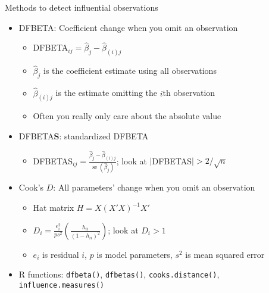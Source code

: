\documentclass[
  ignorenonframetext,
]{beamer}
\providecommand{\tightlist}{%
  \setlength{\itemsep}{0pt}\setlength{\parskip}{0pt}}
\newcommand{\setsep}{\setlength{\itemsep}{3pt}}
\newcommand{\setskip}{\setlength{\parskip}{3pt}}
\renewcommand{\tightlist}{\setsep\setskip}
\begin{document}
\begin{frame}[fragile]{Methods to detect influential observations}
\label{methods-to-detect-influential-observations}
\begin{itemize}[<+->]
\tightlist
\item
  DFBETA: Coefficient change when you omit an observation

  \begin{itemize}[<+->]
  \tightlist
  \item
    DFBETA\(_{ij} = \hat{\beta}_j - \hat{\beta}_{(i)j}\)
  \item
    \(\hat{\beta}_j\) is the coefficient estimate using all observations
  \item
    \(\hat{\beta}_{(i)j}\) is the estimate omitting the \(i\)th observation
  \item
    Often you really only care about the absolute value
  \end{itemize}
\item
  DFBETA\textbf{S}: standardized DFBETA

  \begin{itemize}[<+->]
  \tightlist
  \item
    DFBETAS\(_{ij} = \frac{\hat{\beta}_j - \hat{\beta}_{(i)j}}{\mathop{\mathrm{se}}\left(\hat{\beta}_j\right)}\); look at \(|\)DFBETAS\(| > 2/\sqrt{n}\)
  \end{itemize}
\item
  Cook's \(D\): All parameters' change when you omit an observation

  \begin{itemize}[<+->]
  \tightlist
  \item
    Hat matrix \(H = X (X'X)^{-1} X'\)
  \item
    \(D_i = \frac{e_i^2}{ps^2} \left(\frac{h_{ii}}{(1 - h_{ii})^2}\right)\); look at \(D_i > 1\)
  \item
    \(e_i\) is residual \(i\), \(p\) is model parameters, \(s^2\) is mean squared error
  \end{itemize}
\item
  R functions: \texttt{dfbeta()}, \texttt{dfbetas()}, \texttt{cooks.distance()}, \texttt{influence.measures()}
\end{itemize}
\end{frame}
\end{document}
